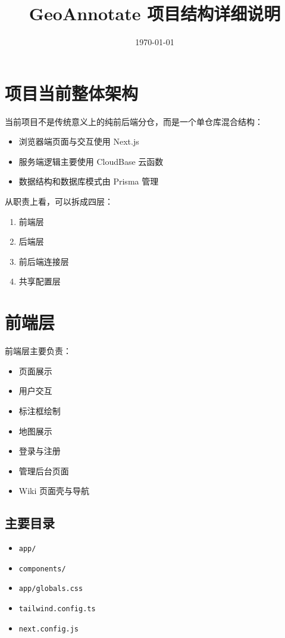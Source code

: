 \documentclass[11pt,a4paper]{ctexart}
\title{GeoAnnotate 项目结构详细说明}
\author{}
\date{\today}
\begin{document}
\maketitle

\section{项目当前整体架构}

当前项目不是传统意义上的纯前后端分仓，而是一个单仓库混合结构：

\begin{itemize}
  \item 浏览器端页面与交互使用 Next.js
  \item 服务端逻辑主要使用 CloudBase 云函数
  \item 数据结构和数据库模式由 Prisma 管理
\end{itemize}

从职责上看，可以拆成四层：

\begin{enumerate}
  \item 前端层
  \item 后端层
  \item 前后端连接层
  \item 共享配置层
\end{enumerate}

\section{前端层}

前端层主要负责：

\begin{itemize}
  \item 页面展示
  \item 用户交互
  \item 标注框绘制
  \item 地图展示
  \item 登录与注册
  \item 管理后台页面
  \item Wiki 页面壳与导航
\end{itemize}

\subsection{主要目录}

\begin{itemize}
  \item \texttt{app/}
  \item \texttt{components/}
  \item \texttt{app/globals.css}
  \item \texttt{tailwind.config.ts}
  \item \texttt{next.config.js}
\end{itemize}
\end{document}
